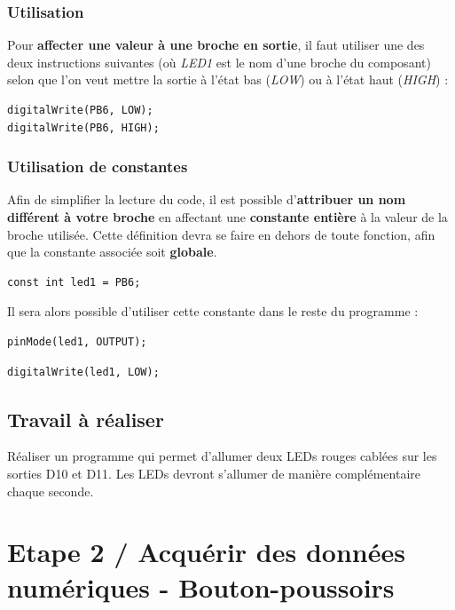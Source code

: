 \documentclass[a4paper,11pt,titlepage]{article} %
\begin{document}
\subsubsection{Utilisation}

Pour \textbf{affecter une valeur à une broche en sortie}, il faut utiliser une des deux instructions suivantes (où \textsl{LED1} est le nom d'une broche du composant) selon que l'on veut mettre la sortie à l'état bas (\textit{LOW}) ou à l'état haut (\textit{HIGH}) :

\begin{lstlisting}
digitalWrite(PB6, LOW);
digitalWrite(PB6, HIGH);
\end{lstlisting}


\subsubsection{Utilisation de constantes}

Afin de simplifier la lecture du code, il est possible d'\textbf{attribuer un nom différent à votre broche} en affectant une \textbf{constante entière} à la valeur de la broche utilisée. Cette définition devra se faire en dehors de toute fonction, afin que la constante associée soit \textbf{globale}.

\begin{lstlisting}
const int led1 = PB6;
\end{lstlisting}

\medskip

Il sera alors possible d'utiliser cette constante dans le reste du programme :

\begin{lstlisting}
pinMode(led1, OUTPUT);
\end{lstlisting}

\begin{lstlisting}
digitalWrite(led1, LOW);
\end{lstlisting}


\subsection{Travail à réaliser}

\Manip Réaliser un programme qui permet d'allumer deux LEDs rouges cablées sur les sorties D10 et D11. Les LEDs devront s'allumer de manière complémentaire chaque seconde.

\newpage
\section{Etape 2 / Acquérir des données numériques - Bouton-poussoirs}
\end{document}
